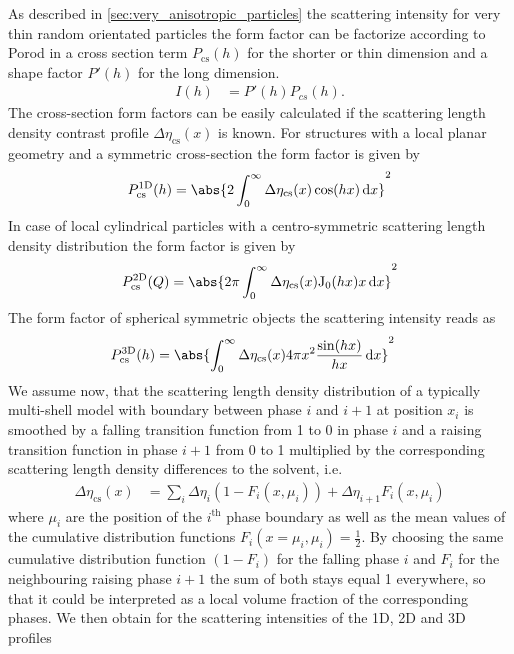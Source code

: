 As described in \ref{sec:very_anisotropic_particles} the scattering intensity for very thin random orientated particles the form factor can be factorize according to Porod \cite{Porod1948} in a cross section term $P_\text{cs}(h)$ for the shorter or thin dimension and a shape factor $P'(h)$ for the long dimension.
\begin{align}
\label{eq:PprimePcs}
I(h) &=P'(h) P_{cs}(h).
\end{align}
The cross-section form factors can be easily calculated if the
scattering length density contrast profile
$\Delta\eta_\textrm{cs}(x)$ is known. For structures with a local
planar geometry and a symmetric cross-section the form factor is
given by
\begin{align}
P_\textrm{cs}^\textrm{1D} (h) = \abs{2\int_0^\infty
\Delta\eta_\textrm{cs}(x) \cos(hx) \, \textrm{d}x}^2
\label{Pcs:1D}
\end{align}
In case of local cylindrical particles with a centro-symmetric
scattering length density distribution the form factor is given by
\begin{align}
P_\textrm{cs}^\textrm{2D} (Q) = \abs{2\pi\int_0^\infty
\Delta\eta_\textrm{cs}(x) \textrm{J}_0(hx)x \,
\textrm{d}x}^2 \label{Pcs:2D}
\end{align}
The form factor of spherical symmetric objects the scattering intensity reads as
\begin{align}
  P_\textrm{cs}^\mathrm{3D}(h) & = \abs{ \int_0^\infty \Delta\eta_\textrm{cs}(x)4\pi x^2 \frac{\sin (hx)}{hx}\,\mathrm{d}x }^2
\label{Pcs:3D}
\end{align}
We assume now, that the scattering length density distribution of a typically multi-shell model with boundary between phase $i$ and $i+1$ at position $x_i$ is smoothed by a falling transition function from 1 to 0 in phase $i$ and a raising transition function in phase $i+1$ from 0 to 1 multiplied by the corresponding scattering  length density differences to the solvent, i.e.
\begin{align}\label{eq:smoothedDetaCS}
  \Delta\eta_\textrm{cs}(x) &= \sum_i \Delta\eta_i (1-F_i(x,\mu_i)) + \Delta\eta_{i+1} F_i(x,\mu_i)
\end{align}
where $\mu_i$ are the position of the $i^\mathrm{th}$ phase boundary as well as the mean values of the cumulative distribution functions $F_i(x=\mu_i,\mu_i)=\frac12$. By choosing the same cumulative distribution function $(1-F_i)$ for the falling phase $i$ and $F_i$ for the neighbouring raising phase $i+1$ the sum of both stays equal 1 everywhere, so that it could be interpreted as a local volume fraction of the corresponding phases. We then obtain for the scattering intensities of the 1D, 2D and 3D profiles
